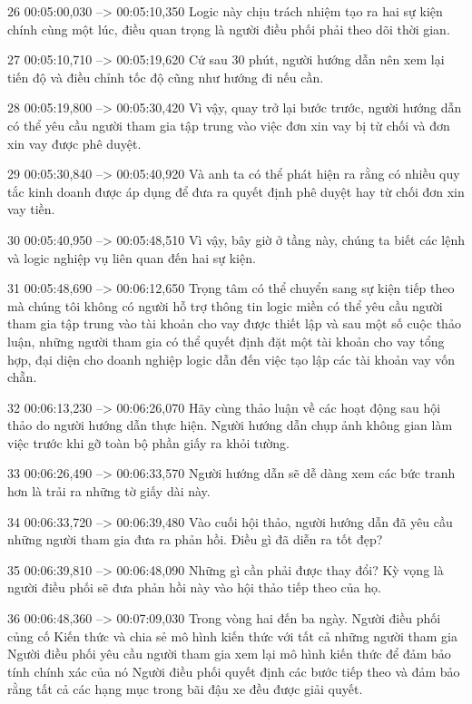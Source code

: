 26
00:05:00,030 --> 00:05:10,350
Logic này chịu trách nhiệm tạo ra hai sự kiện chính cùng một lúc, điều quan trọng là người điều phối phải theo dõi thời gian.

27
00:05:10,710 --> 00:05:19,620
Cứ sau 30 phút, người hướng dẫn nên xem lại tiến độ và điều chỉnh tốc độ cũng như hướng đi nếu cần.

28
00:05:19,800 --> 00:05:30,420
Vì vậy, quay trở lại bước trước, người hướng dẫn có thể yêu cầu người tham gia tập trung vào việc đơn xin vay bị từ chối và đơn xin vay được phê duyệt.

29
00:05:30,840 --> 00:05:40,920
Và anh ta có thể phát hiện ra rằng có nhiều quy tắc kinh doanh được áp dụng để đưa ra quyết định phê duyệt hay từ chối đơn xin vay tiền.

30
00:05:40,950 --> 00:05:48,510
Vì vậy, bây giờ ở tầng này, chúng ta biết các lệnh và logic nghiệp vụ liên quan đến hai sự kiện.

31
00:05:48,690 --> 00:06:12,650
Trọng tâm có thể chuyển sang sự kiện tiếp theo mà chúng tôi không có người hỗ trợ thông tin logic miền có thể yêu cầu người tham gia tập trung vào tài khoản cho vay được thiết lập và sau một số cuộc thảo luận, những người tham gia có thể quyết định đặt một tài khoản cho vay tổng hợp, đại diện cho doanh nghiệp  logic dẫn đến việc tạo lập các tài khoản vay vốn chẵn.

32
00:06:13,230 --> 00:06:26,070
Hãy cùng thảo luận về các hoạt động sau hội thảo do người hướng dẫn thực hiện.  Người hướng dẫn chụp ảnh không gian làm việc trước khi gỡ toàn bộ phần giấy ra khỏi tường.

33
00:06:26,490 --> 00:06:33,570
Người hướng dẫn sẽ dễ dàng xem các bức tranh hơn là trải ra những tờ giấy dài này.

34
00:06:33,720 --> 00:06:39,480
Vào cuối hội thảo, người hướng dẫn đã yêu cầu những người tham gia đưa ra phản hồi.  Điều gì đã diễn ra tốt đẹp?

35
00:06:39,810 --> 00:06:48,090
Những gì cần phải được thay đổi?  Kỳ vọng là người điều phối sẽ đưa phản hồi này vào hội thảo tiếp theo của họ.

36
00:06:48,360 --> 00:07:09,030
Trong vòng hai đến ba ngày.  Người điều phối củng cố Kiến thức và chia sẻ mô hình kiến ​​thức với tất cả những người tham gia Người điều phối yêu cầu người tham gia xem lại mô hình kiến ​​thức để đảm bảo tính chính xác của nó Người điều phối quyết định các bước tiếp theo và đảm bảo rằng tất cả các hạng mục trong bãi đậu xe đều được giải quyết.

